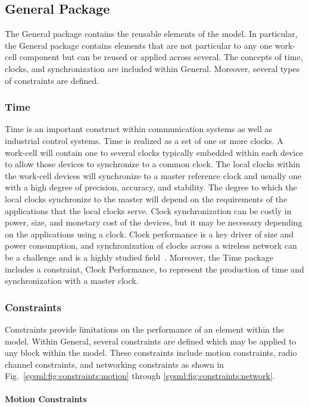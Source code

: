 \subsection{General Package}
The General package contains the reusable elements of the model.  In particular, the General package contains elements that are not particular to any one work-cell component but can be reused or applied across several.  The concepts of time, clocks, and synchronization are included within General.  Moreover, several types of constraints are defined.  

\subsubsection{Time}
Time is an important construct within communication systems as well as industrial control systems.  Time is realized as a set of one or more clocks. A work-cell will contain one to several clocks typically embedded within each device to allow those devices to synchronize to a common clock. The local clocks within the work-cell devices will synchronize to a master reference clock and usually one with a high degree of precision, accuracy, and stability.  The degree to which the local clocks synchronize to the master will depend on the requirements of the applications that the local clocks serve.  Clock synchronization can be costly in power, size, and monetary cost of the devices, but it may be necessary depending on the applications using a clock.  Clock performance is a key driver of size and power consumption, and synchronization of clocks across a wireless network can be a challenge and is a highly studied field~\cite{ClockSync.Mahmood2017,ClockSync.Geetha2017}. Moreover, the Time package includes a constraint, Clock Performance, to represent the production of time and synchronization with a master clock. 

\subsubsection{Constraints}\label{sysml:sec:general:constraints}
Constraints provide limitations on the performance of an element within the model.  Within General, several constraints are defined which may be applied to any block within the model. These constraints include motion constraints, radio channel constraints, and networking constraints as shown in Fig.~\ref{sysml:fig:constraints:motion} through \ref{sysml:fig:constraints:network}.  

\paragraph{Motion Constraints}\label{sysml:sec:constraints:motion}

